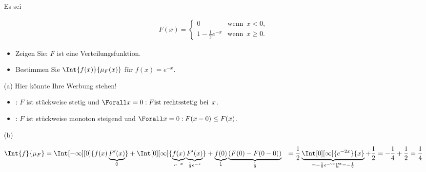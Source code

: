 \begin{exercise}

Es sei

\begin{align*}
  F(x) =
  \begin{cases}
    0                       & \text{wenn} \enspace x < 0, \\
    1 - \frac{1}{2} e^{-x}  & \text{wenn} \enspace x \geq 0.
  \end{cases}
\end{align*}

\begin{itemize}
  \item[(a)] Zeigen Sie: $F$ ist eine Verteilungsfunktion.
  \item[(b)] Bestimmen Sie $\Int{f(x)}{\mu_F(x)}$ für $f(x) = e^{-x}$.
\end{itemize}

\end{exercise}


\begin{solution}

(a) Hier könnte Ihre Werbung stehen!

\begin{itemize}

  \item {}: $F$ ist stückweise stetig und $\Forall x = 0: F \text{ist rechtsstetig bei} \enspace x$.

  \item {}: $F$ ist stückweise monoton steigend und $\Forall x = 0: F(x - 0) \leq F(x)$.

\end{itemize}

(b)

\begin{align*}
  \Int{f}{\mu_F}
  & =
  \Int[-\infty][0]{f(x) \underbrace{F^\prime(x)}_0}
  +
  \Int[0][\infty]
  {
    \underbrace{f(x)}_{e^{-x}}
    \underbrace{F^\prime(x)}_{\frac{1}{2} e^{-x}}
  }
  +
  \underbrace{f(0)}_1 \underbrace{(F(0) - F(0 - 0))}_\frac{1}{2}
  & =
  \frac{1}{2} \underbrace
  {
    \Int[0][\infty]{e^{-2x}}{x}
  }_{
    = -\frac{1}{2} e^{-2x} |_0^\infty
    = -\frac{1}{2}
  }
  +
  \frac{1}{2}
  =
  -\frac{1}{4} + \frac{1}{2} = \frac{1}{4}
\end{align*}

\end{solution}
